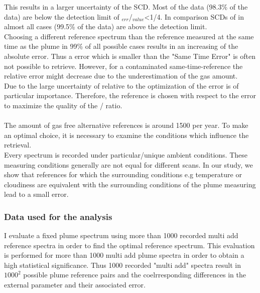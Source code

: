 %
This results in a larger uncertainty of the   SCD. Most of the  data (98.3\% of the data) are below the detection limit of $_{err}$/$_{value}$<1/4. In comparison SCDs of  in almost all cases (99.5\% of the data)  are above the detection limit. \\
%
Choosing a different reference spectrum than the reference measured at the same time as the plume in 99\% of all possible cases results in an increasing of the absolute error. 
Thus a  error which is smaller than the "Same Time Error" is often not  possible to retrieve. 
However, for a contaminated same-time-reference the relative error might decrease due to the underestimation of the gas amount. \\
Due to the large uncertainty of  relative to  the optimization of the  error is of particular importance. Therefore, the reference is chosen with respect to the  error to maximize the quality of the / ratio. \\
\\
The amount of gas free alternative references is around 1500 per year. To make an optimal choice, it is necessary to examine the conditions which influence the  retrieval.\\
Every spectrum is recorded under particular/unique ambient conditions. These measuring conditions generally are not equal for different scans. In our study, we show that references for which the surrounding conditions e.g temperature or cloudiness are equivalent with the surrounding conditions of the  plume measuring lead to a small error.\\
%
\subsubsection*{Data used for the analysis}
I evaluate a fixed plume spectrum using more than 1000 recorded multi add reference spectra in order to find the optimal reference spectrum. This evaluation is performed for more than 1000 multi add plume spectra in order to obtain a high statistical significance. Thus 1000 recorded "multi add" spectra result in $1000^2$ possible plume reference pairs and the coelrresponding differences in the external parameter and their associated  error. 


